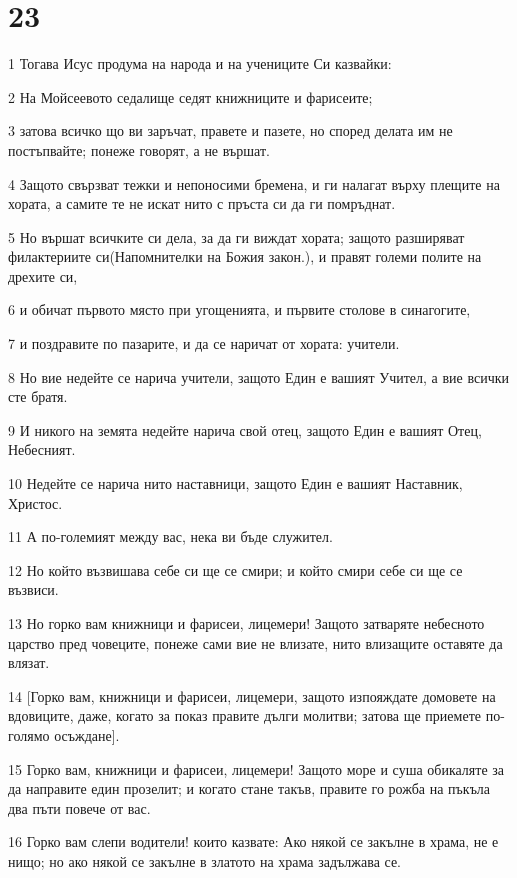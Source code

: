 \chapter{23}

\par 1 Тогава Исус продума на народа и на учениците Си казвайки:
\par 2 На Мойсеевото седалище седят книжниците и фарисеите;
\par 3 затова всичко що ви заръчат, правете и пазете, но според делата им не постъпвайте; понеже говорят, а не вършат.
\par 4 Защото свързват тежки и непоносими бремена, и ги налагат върху плещите на хората, а самите те не искат нито с пръста си да ги помръднат.
\par 5 Но вършат всичките си дела, за да ги виждат хората; защото разширяват филактериите си(Напомнителки на Божия закон.), и правят големи полите на дрехите си,
\par 6 и обичат първото място при угощенията, и първите столове в синагогите,
\par 7 и поздравите по пазарите, и да се наричат от хората: учители.
\par 8 Но вие недейте се нарича учители, защото Един е вашият Учител, а вие всички сте братя.
\par 9 И никого на земята недейте нарича свой отец, защото Един е вашият Отец, Небесният.
\par 10 Недейте се нарича нито наставници, защото Един е вашият Наставник, Христос.
\par 11 А по-големият между вас, нека ви бъде служител.
\par 12 Но който възвишава себе си ще се смири; и който смири себе си ще се възвиси.
\par 13 Но горко вам книжници и фарисеи, лицемери! Защото затваряте небесното царство пред човеците, понеже сами вие не влизате, нито влизащите оставяте да влязат.
\par 14 [Горко вам, книжници и фарисеи, лицемери, защото изпояждате домовете на вдовиците, даже, когато за показ правите дълги молитви; затова ще приемете по-голямо осъждане].
\par 15 Горко вам, книжници и фарисеи, лицемери! Защото море и суша обикаляте за да направите един прозелит; и когато стане такъв, правите го рожба на пъкъла два пъти повече от вас.
\par 16 Горко вам слепи водители! които казвате: Ако някой се закълне в храма, не е нищо; но ако някой се закълне в златото на храма задължава се.
